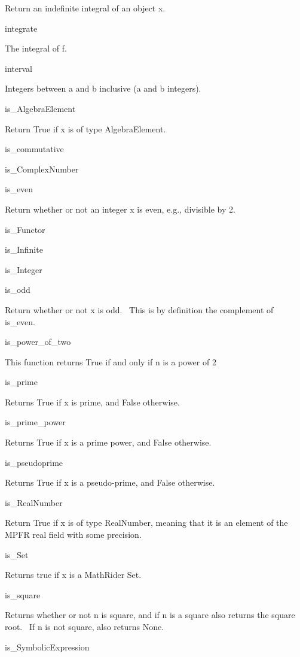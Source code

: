 \documentclass[12pt,twoside]{book}
\begin{document}
Return an indefinite integral of an object x.

integrate \ \ \ \ 

The integral of f.

interval \ \ \ \ 

Integers between a and b inclusive (a and b integers).

is\_AlgebraElement

Return True if x is of type AlgebraElement.

is\_commutative


\bigskip

is\_ComplexNumber



is\_even

Return whether or not an integer x is even, e.g., divisible by 2.

is\_Functor 


\bigskip

is\_Infinite 


\bigskip

is\_Integer 


\bigskip

is\_odd 

Return whether or not x is odd. \ This is by definition the complement
of is\_even.

is\_power\_of\_two

This function returns True if and only if n is a power of 2

is\_prime

Returns True if x is prime, and False otherwise.

is\_prime\_power \ \ \ \ 

Returns True if x is a prime power, and False otherwise.

is\_pseudoprime

Returns True if x is a pseudo{}-prime, and False otherwise.

is\_RealNumber

Return True if x is of type RealNumber, meaning that it is an element of
the MPFR real field with some precision.

is\_Set

Returns true if x is a MathRider Set.

is\_square

Returns whether or not n is square, and if n is a square also returns
the square root. \ If n is not square, also returns None.

is\_SymbolicExpression
\end{document}
